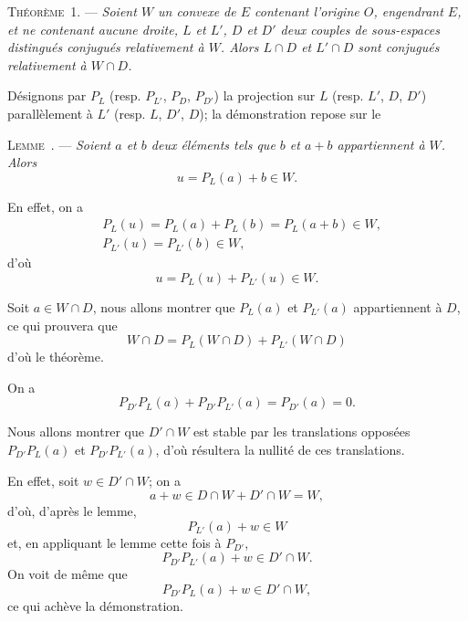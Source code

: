 \documentclass[11pt]{article}
\newcommand{\bzcf}[2]{#1}
\newcommand{\bznum}[1]{\if\relax\detokenize{#1}\relax\else\ #1\fi}
\newenvironment{theoreme}[1][]{\par\medskip\noindent\textsc{Théorème\bznum{#1}.} --- \itshape}{\par\medskip}
\newenvironment{lemme}[1][]{\par\medskip\noindent\textsc{Lemme\bznum{#1}.} --- \itshape}{\par\medskip}
\newenvironment{proof}[1][]{\par}{\par}
\begin{document}
\begin{theoreme}[1]
Soient $W$ un convexe de $E$ contenant l'origine $O$, engendrant $E$, et ne contenant aucune
droite, $L$ et $L'$, $D$ et $D'$ deux couples de sous-espaces distingués conjugués relativement à
$W$. Alors $L\cap D$ et $L'\cap D$ sont conjugués relativement à $W\cap D$.
\end{theoreme}

\begin{proof}[Proof of \ref{bzthm:c3s2t1_conjugues_intersection}]
Désignons par $P_L$ (resp. $P_{L'}$, $P_D$, $P_{D'}$) la projection sur $L$ (resp. $L'$, $D$, $D'$)
parallèlement à $L'$ (resp. $L$, $D'$, $D$); la démonstration repose sur le
\end{proof}

\begin{lemme}
Soient $a$ et $b$ deux éléments tels que $b$ et $a+b$ appartiennent à $W$. Alors
\[ u=P_L(a)+b\in W. \]
\end{lemme}

\begin{proof}
En effet, on a
\[ \begin{aligned} &P_L(u)=P_L(a)+P_L(b)=P_L(a+b)\in W,\\ &P_{L'}(u)=P_{L'}(b)\in W,
\end{aligned} \]
d'où
\[ u=P_L(u)+P_{L'}(u)\in W. \]
\end{proof}

\begin{proof}[Proof of \ref{bzthm:c3s2t1_conjugues_intersection}]
Soit $a\in W\cap D$, nous allons montrer que $P_L(a)$ et $P_{L'}(a)$ appartiennent à $D$, ce qui
prouvera que
\[ W\cap D=P_L(W\cap D)+P_{L'}(W\cap D) \]
d'où le théorème.

On a
\[ P_{D'}P_L(a)+P_{D'}P_{L'}(a)=P_{D'}(a)=0. \]

Nous allons montrer que $D'\cap W$ est stable par les translations opposées $P_{D'}P_L(a)$ et
$P_{D'}P_{L'}(a)$, d'où résultera la nullité de ces translations.

En effet, soit $w\in D'\cap W$; on a
\[ a+w\in D\cap W+D'\cap W=W, \]
d'où, d'après \bzcf{le lemme}{\ref{bzlem:c3s2l1_projection_somme}},
\[ P_{L'}(a)+w\in W \]
et, en appliquant \bzcf{le lemme}{\ref{bzlem:c3s2l1_projection_somme}} cette fois à $P_{D'}$,
\[ P_{D'}P_{L'}(a)+w\in D'\cap W. \]
On voit de même que
\[ P_{D'}P_L(a)+w\in D'\cap W, \]
ce qui achève la démonstration.
\end{proof}
\end{document}
